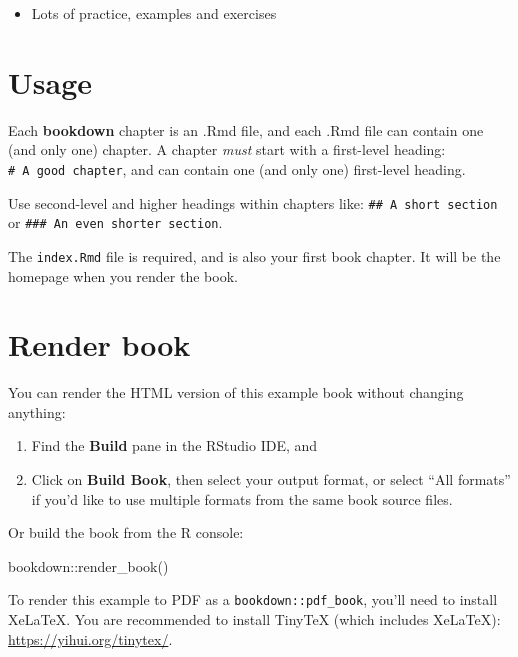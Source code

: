 \documentclass[
]{book}
\newenvironment{Shaded}{\begin{snugshade}}{\end{snugshade}}
\newcommand{\FunctionTok}[1]{\textcolor[rgb]{0.00,0.00,0.00}{#1}}
\newcommand{\NormalTok}[1]{#1}
\newcommand{\SpecialCharTok}[1]{\textcolor[rgb]{0.00,0.00,0.00}{#1}}
\providecommand{\tightlist}{%
  \setlength{\itemsep}{0pt}\setlength{\parskip}{0pt}}
\begin{document}
\begin{itemize}
\tightlist
\item
  Lots of practice, examples and exercises
\end{itemize}

\hypertarget{usage}{%
\section{Usage}\label{usage}}

Each \textbf{bookdown} chapter is an .Rmd file, and each .Rmd file can contain one (and only one) chapter. A chapter \emph{must} start with a first-level heading: \texttt{\#\ A\ good\ chapter}, and can contain one (and only one) first-level heading.

Use second-level and higher headings within chapters like: \texttt{\#\#\ A\ short\ section} or \texttt{\#\#\#\ An\ even\ shorter\ section}.

The \texttt{index.Rmd} file is required, and is also your first book chapter. It will be the homepage when you render the book.

\hypertarget{render-book}{%
\section{Render book}\label{render-book}}

You can render the HTML version of this example book without changing anything:

\begin{enumerate}
\def\labelenumi{\arabic{enumi}.}
\item
  Find the \textbf{Build} pane in the RStudio IDE, and
\item
  Click on \textbf{Build Book}, then select your output format, or select ``All formats'' if you'd like to use multiple formats from the same book source files.
\end{enumerate}

Or build the book from the R console:

\begin{Shaded}
\begin{Highlighting}[]
\NormalTok{bookdown}\SpecialCharTok{::}\FunctionTok{render\_book}\NormalTok{()}
\end{Highlighting}
\end{Shaded}

To render this example to PDF as a \texttt{bookdown::pdf\_book}, you'll need to install XeLaTeX. You are recommended to install TinyTeX (which includes XeLaTeX): \url{https://yihui.org/tinytex/}.
\end{document}
